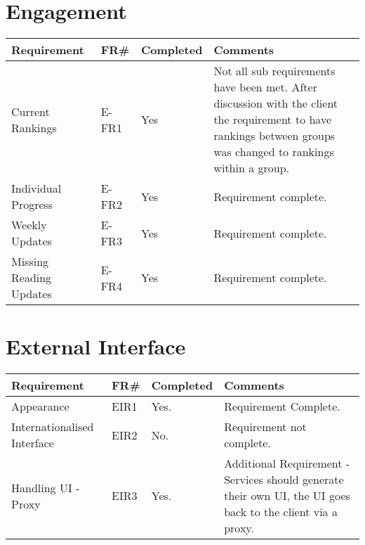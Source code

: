 \section{Engagement}
\begin{tabular}{ |p{5cm}|l|l|p{8cm}|}
\hline
\textbf{Requirement}	&	\textbf{FR\#}	&	\textbf{Completed}	&	\textbf{Comments} \\
\hline
Current Rankings 									& E-FR1		& Yes	& Not all sub requirements have been met. After discussion with the client the requirement to have rankings between groups was changed to rankings within a group.  \\
\hline
Individual Progress									& E-FR2		& Yes	& Requirement complete. \\
\hline
Weekly Updates 										& E-FR3		& Yes	& Requirement complete. \\
\hline
Missing Reading Updates 							& E-FR4		& Yes	& Requirement complete. \\

\hline
\end{tabular}


\section{External Interface}
\begin{tabular}{ |p{5cm}|l|l|p{8cm}|}
\hline
\textbf{Requirement}	&	\textbf{FR\#}	&	\textbf{Completed}	&	\textbf{Comments} \\
\hline
Appearance & EIR1 & Yes. & Requirement Complete. \\
\hline
Internationalised Interface & EIR2 & No. & Requirement not complete. \\
\hline
Handling UI - Proxy & EIR3 & Yes. & Additional Requirement - Services should generate their own UI, the UI goes back to the client via a proxy. \\
\hline
\end{tabular}
